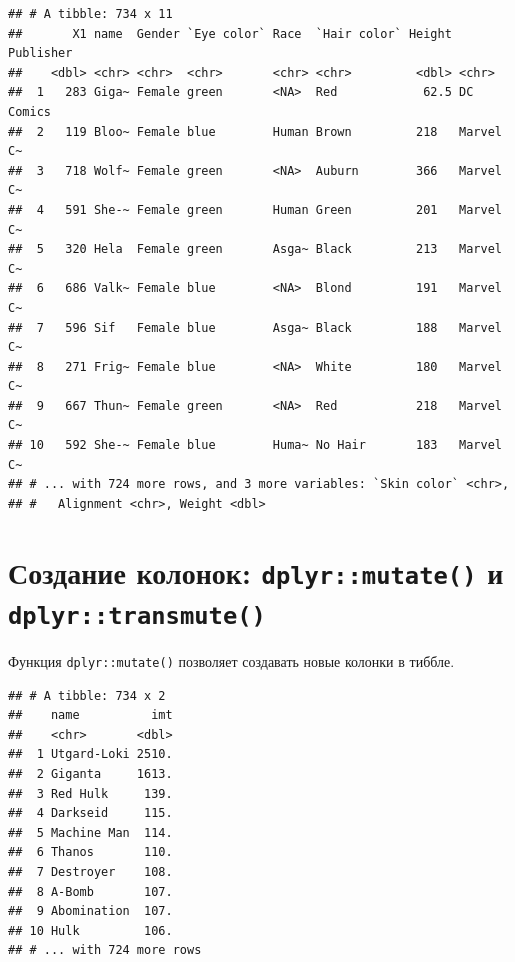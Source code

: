 \documentclass[
]{book}
\newenvironment{Shaded}{\begin{snugshade}}{\end{snugshade}}
\newcommand{\DataTypeTok}[1]{\textcolor[rgb]{0.13,0.29,0.53}{#1}}
\newcommand{\DecValTok}[1]{\textcolor[rgb]{0.00,0.00,0.81}{#1}}
\newcommand{\KeywordTok}[1]{\textcolor[rgb]{0.13,0.29,0.53}{\textbf{#1}}}
\newcommand{\NormalTok}[1]{#1}
\newcommand{\OperatorTok}[1]{\textcolor[rgb]{0.81,0.36,0.00}{\textbf{#1}}}
\newcommand{\StringTok}[1]{\textcolor[rgb]{0.31,0.60,0.02}{#1}}
\begin{document}
\begin{verbatim}
## # A tibble: 734 x 11
##       X1 name  Gender `Eye color` Race  `Hair color` Height Publisher
##    <dbl> <chr> <chr>  <chr>       <chr> <chr>         <dbl> <chr>    
##  1   283 Giga~ Female green       <NA>  Red            62.5 DC Comics
##  2   119 Bloo~ Female blue        Human Brown         218   Marvel C~
##  3   718 Wolf~ Female green       <NA>  Auburn        366   Marvel C~
##  4   591 She-~ Female green       Human Green         201   Marvel C~
##  5   320 Hela  Female green       Asga~ Black         213   Marvel C~
##  6   686 Valk~ Female blue        <NA>  Blond         191   Marvel C~
##  7   596 Sif   Female blue        Asga~ Black         188   Marvel C~
##  8   271 Frig~ Female blue        <NA>  White         180   Marvel C~
##  9   667 Thun~ Female green       <NA>  Red           218   Marvel C~
## 10   592 She-~ Female blue        Huma~ No Hair       183   Marvel C~
## # ... with 724 more rows, and 3 more variables: `Skin color` <chr>,
## #   Alignment <chr>, Weight <dbl>
\end{verbatim}

\hypertarget{tidy_mutate}{%
\section{\texorpdfstring{Создание колонок: \texttt{dplyr::mutate()} и \texttt{dplyr::transmute()}}{Создание колонок: dplyr::mutate() и dplyr::transmute()}}\label{tidy_mutate}}

Функция \texttt{dplyr::mutate()} позволяет создавать новые колонки в тиббле.

\begin{Shaded}
\end{Shaded}

\begin{verbatim}
## # A tibble: 734 x 2
##    name          imt
##    <chr>       <dbl>
##  1 Utgard-Loki 2510.
##  2 Giganta     1613.
##  3 Red Hulk     139.
##  4 Darkseid     115.
##  5 Machine Man  114.
##  6 Thanos       110.
##  7 Destroyer    108.
##  8 A-Bomb       107.
##  9 Abomination  107.
## 10 Hulk         106.
## # ... with 724 more rows
\end{verbatim}
\end{document}
